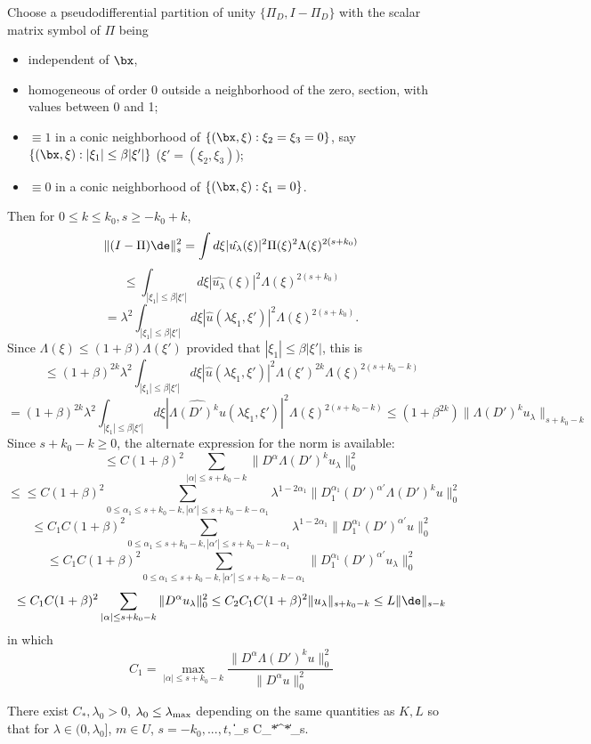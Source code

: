 Choose a pseudodifferential partition of unity $\{\Pi_D,I-\Pi_D\}$ with
the scalar matrix symbol of $\Pi$ being
\begin{itemize}
\item independent of $\bx$,
\item homogeneous of order 0 outside a neighborhood of the zero, 
  section, with  values between 0 and 1;
\item $\equiv 1$ in a conic neighborhood of $\{(\bx,{\bf
    \xi}):\xi_2=\xi_3=0\}$, say  $\{(\bx,{\bf \xi}):|\xi_1|\le \beta
  |\xi'|\}$ ($\xi'=(\xi_2,\xi_3)$); 
\item $\equiv 0$ in a conic neighborhood of  $\{(\bx,{\bf
    \xi}):\xi_1=0\}$. 
\end{itemize}
Then for $0\le k \le k_0, s\ge-k_0+k$, 
\[
\|(I-\Pi)\de\|_s^2  = \int d\xi |\hat{u_\lambda}(\xi)|^2\Pi(\xi)^2\Lambda(\xi)^{2(s+k_0)} 
\]
\[
\le \int_{|\xi_1| \le \beta|\xi'|} d\xi |\hat{u_\lambda}(\xi)|^2\Lambda(\xi)^{2(s+k_0)} 
\]
\[
= \lambda^2 \int_{|\xi_1| \le \beta|\xi'|} d\xi
\left|\hat{u}\left(\lambda \xi_1,\xi'\right)\right|^2\Lambda(\xi)^{2(s+k_0)} .
\]
Since $\Lambda(\xi) \le (1+\beta)\Lambda(\xi')$ provided that $|\xi_1|
\le \beta |\xi'|$, this is
\[
\le (1+\beta)^{2k} \lambda^2 \int_{|\xi_1| \le \beta|\xi'|} d\xi
\left|\hat{u}\left(\lambda
    \xi_1,\xi'\right)\right|^2\Lambda(\xi')^{2k}\Lambda(\xi)^{2(s+k_0-k)} 
\]
\[
=(1+\beta)^{2k} \lambda^2 \int_{|\xi_1| \le \beta|\xi'|} d\xi
\left|\widehat{\Lambda(D')^ku}\left(\lambda
    \xi_1,\xi'\right)\right|^2\Lambda(\xi)^{2(s+k_0-k)}  \le (1+\beta^{2k})\|\Lambda(D')^ku_{\lambda}\|_{s+k_0-k}
\]
Since $s+k_0-k \ge 0$, the alternate expression for the norm is
available:
\[
\le C(1+\beta)^2 \sum_{ |\alpha| \le s+k_0-k}
\|D^{\alpha}\Lambda(D')^ku_{\lambda}\|_0^2 
\]
\[
\le \le C(1+\beta)^2 \sum_{
  0 \le \alpha_1 \le s+k_0-k, |\alpha'| \le s+k_0-k-\alpha_1}
\lambda^{1-2\alpha_1}\|D_1^{\alpha_1}(D')^{\alpha'}\Lambda(D')^ku\|_0^2
\]
\[
 \le C_1C(1+\beta)^2 \sum_{
  0 \le \alpha_1 \le s+k_0-k, |\alpha'| \le s+k_0-k-\alpha_1}
\lambda^{1-2\alpha_1}\|D_1^{\alpha_1}(D')^{\alpha'}u\|_0^2
\]
\[
 \le C_1C(1+\beta)^2 \sum_{
  0 \le \alpha_1 \le s+k_0-k, |\alpha'| \le s+k_0-k-\alpha_1}
\|D_1^{\alpha_1}(D')^{\alpha'}u_{\lambda}\|_0^2
\]
\[
\le C_1C(1+\beta)^2 \sum_{ |\alpha| \le s+k_0-k}
\|D^{\alpha}u_{\lambda}\|_0^2 \le C_2 C_1 C (1+\beta)^2
\|u_\lambda\|_{s+k_0-k} \le L \|\de\|_{s-k}
\]
in which 
\[
C_1 = \max_{|\alpha| \le
  s+k_0-k}\frac{\|D^{\alpha}\Lambda(D')^ku\|_0^2}
{\|D^{\alpha}u\|_0^2}
\]

 There exist $C_*,\lambda_0>0$, $\lambda_0 \le \lambda_{\rm max}$ depending on the same quantities as $K,L$ so that for $\lambda \in (0,\lambda_0]$, $m \in U$, $s=-k_0,...,t$, 
\be
\label{lemma1:res}
\|\de\|_s \le C_*\|\oF[m_b]^*\de\|_s.
\ee

